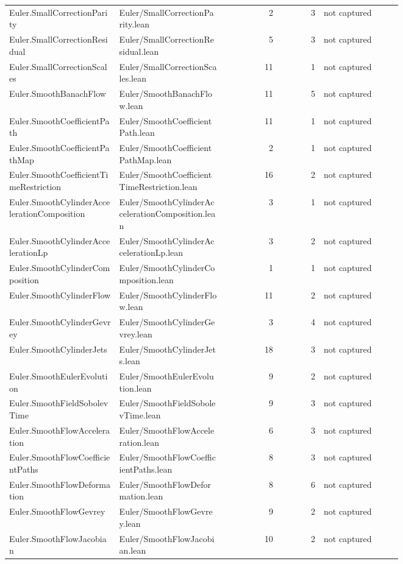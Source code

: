 \documentclass[10pt]{article}
\begin{document}
\begin{longtable}{p{0.28\linewidth}p{0.27\linewidth}r r p{0.20\linewidth}}
Euler.SmallCorrectionParity & Euler/SmallCorrectionParity.lean & 2 & 3 & not captured\\
Euler.SmallCorrectionResidual & Euler/SmallCorrectionResidual.lean & 5 & 3 & not captured\\
Euler.SmallCorrectionScales & Euler/SmallCorrectionScales.lean & 11 & 1 & not captured\\
Euler.SmoothBanachFlow & Euler/SmoothBanachFlow.lean & 11 & 5 & not captured\\
Euler.SmoothCoefficientPath & Euler/SmoothCoefficientPath.lean & 11 & 1 & not captured\\
Euler.SmoothCoefficientPathMap & Euler/SmoothCoefficientPathMap.lean & 2 & 1 & not captured\\
Euler.SmoothCoefficientTimeRestriction & Euler/SmoothCoefficientTimeRestriction.lean & 16 & 2 & not captured\\
Euler.SmoothCylinderAccelerationComposition & Euler/SmoothCylinderAccelerationComposition.lean & 3 & 1 & not captured\\
Euler.SmoothCylinderAccelerationLp & Euler/SmoothCylinderAccelerationLp.lean & 3 & 2 & not captured\\
Euler.SmoothCylinderComposition & Euler/SmoothCylinderComposition.lean & 1 & 1 & not captured\\
Euler.SmoothCylinderFlow & Euler/SmoothCylinderFlow.lean & 11 & 2 & not captured\\
Euler.SmoothCylinderGevrey & Euler/SmoothCylinderGevrey.lean & 3 & 4 & not captured\\
Euler.SmoothCylinderJets & Euler/SmoothCylinderJets.lean & 18 & 3 & not captured\\
Euler.SmoothEulerEvolution & Euler/SmoothEulerEvolution.lean & 9 & 2 & not captured\\
Euler.SmoothFieldSobolevTime & Euler/SmoothFieldSobolevTime.lean & 9 & 3 & not captured\\
Euler.SmoothFlowAcceleration & Euler/SmoothFlowAcceleration.lean & 6 & 3 & not captured\\
Euler.SmoothFlowCoefficientPaths & Euler/SmoothFlowCoefficientPaths.lean & 8 & 3 & not captured\\
Euler.SmoothFlowDeformation & Euler/SmoothFlowDeformation.lean & 8 & 6 & not captured\\
Euler.SmoothFlowGevrey & Euler/SmoothFlowGevrey.lean & 9 & 2 & not captured\\
Euler.SmoothFlowJacobian & Euler/SmoothFlowJacobian.lean & 10 & 2 & not captured\\

\end{longtable}
\end{document}
